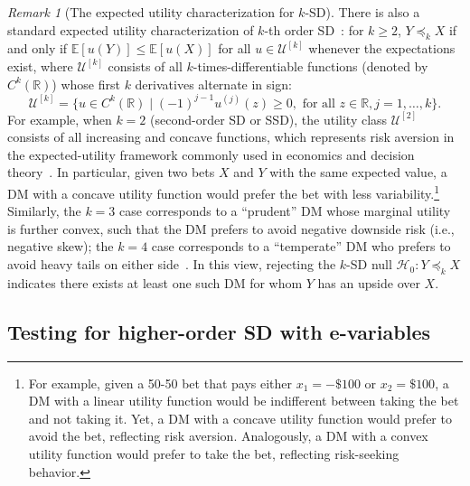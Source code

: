 \documentclass[12pt,twoside]{article}
\theoremstyle{plain}
\theoremstyle{definition}
\theoremstyle{remark}
\newtheorem{remark}{Remark}
\newcommand{\R}{\mathbb{R}}
\newcommand{\calH}{\mathcal{H}}
\newcommand{\calU}{\mathcal{U}}
\newcommand{\Esymb}{\mathbb{E}}
\newcommand{\ex}[1]{\Esymb\left[{#1}\right]}
\newcommand{\ksd}{\preceq_{k}}
\begin{document}
\begin{remark}[The expected utility characterization for $k$-SD]\label{remark:eu_ksd}
    There is also a standard expected utility characterization of $k$-th order SD~\citep{fishburn1970utility}: 
    for $k\geq 2$, $Y \ksd X$ if and only if $\ex{u(Y)} \leq \ex{u(X)}$ for all $u \in \calU^{[k]}$ whenever the expectations exist, where $\calU^{[k]}$ consists of all $k$-times-differentiable functions (denoted by $C^k(\R)$) whose first $k$ derivatives alternate in sign:
    \begin{equation*}\label{eq:utility_class_kSD}
        \calU^{[k]} = \{u\in C^k(\R) \mid (-1)^{j-1} u^{(j)} (z) \geq 0, \textrm{ for all }z \in \R, j=1, \ldots, k\}.
    \end{equation*}
    For example, when $k=2$ (second-order SD or SSD), the utility class $\calU^{[2]}$ consists of all increasing and concave functions, which represents risk aversion in
the expected-utility framework
commonly used in economics and decision theory~\citep{pratt1964risk,rothschild1970risk}. 
    In particular, given two bets $X$ and $Y$ with the same expected value, a DM with a concave utility function would prefer the bet with less variability.\footnote{For example, given a 50-50 bet that pays either $x_1=-\$100$ or $x_2=\$100$, a DM with a linear utility function would be indifferent between
taking the bet and not taking it.
    Yet, a DM with a concave utility function would prefer to avoid the bet, reflecting risk aversion. Analogously, a DM with a convex utility function would prefer to take the bet, reflecting risk-seeking behavior.}
    Similarly, the $k=3$ case corresponds to a ``prudent'' DM whose marginal utility is further convex, such that the DM prefers to avoid negative downside risk (i.e., negative skew); the $k=4$ case corresponds to a ``temperate'' DM who prefers to avoid heavy tails on either side~\citep{whitmore1970third,fishburn1976continua,kimball1990precautionary}. 
    In this view, rejecting the $k$-SD null $\calH_0: Y \ksd X$ indicates there exists at least one such DM for whom $Y$ has an upside over $X$. 
\end{remark}



\subsection{Testing for higher-order SD with e-variables}\label{sec:higher_order_evariable}
\end{document}
